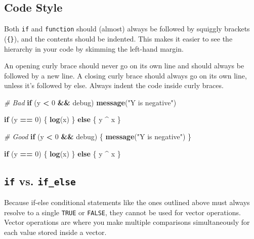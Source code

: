 \documentclass[]{book}
\newenvironment{Shaded}{\begin{snugshade}}{\end{snugshade}}
\newcommand{\CommentTok}[1]{\textcolor[rgb]{0.56,0.35,0.01}{\textit{#1}}}
\newcommand{\ControlFlowTok}[1]{\textcolor[rgb]{0.13,0.29,0.53}{\textbf{#1}}}
\newcommand{\DecValTok}[1]{\textcolor[rgb]{0.00,0.00,0.81}{#1}}
\newcommand{\KeywordTok}[1]{\textcolor[rgb]{0.13,0.29,0.53}{\textbf{#1}}}
\newcommand{\NormalTok}[1]{#1}
\newcommand{\OperatorTok}[1]{\textcolor[rgb]{0.81,0.36,0.00}{\textbf{#1}}}
\newcommand{\StringTok}[1]{\textcolor[rgb]{0.31,0.60,0.02}{#1}}
\begin{document}
\hypertarget{code-style}{%
\subsection{Code Style}\label{code-style}}

Both \texttt{if} and \texttt{function} should (almost) always be followed by squiggly brackets (\texttt{\{\}}), and the contents should be indented. This makes it easier to see the hierarchy in your code by skimming the left-hand margin.

An opening curly brace should never go on its own line and should always be followed by a new line. A closing curly brace should always go on its own line, unless it's followed by else. Always indent the code inside curly braces.

\begin{Shaded}
\begin{Highlighting}[]
\CommentTok{# Bad}
\ControlFlowTok{if}\NormalTok{ (y }\OperatorTok{<}\StringTok{ }\DecValTok{0} \OperatorTok{&&}\StringTok{ }\NormalTok{debug)}
\KeywordTok{message}\NormalTok{(}\StringTok{"Y is negative"}\NormalTok{)}

\ControlFlowTok{if}\NormalTok{ (y }\OperatorTok{==}\StringTok{ }\DecValTok{0}\NormalTok{) \{}
  \KeywordTok{log}\NormalTok{(x)}
\NormalTok{\} }
\ControlFlowTok{else}\NormalTok{ \{}
\NormalTok{  y }\OperatorTok{^}\StringTok{ }\NormalTok{x}
\NormalTok{\}}

\CommentTok{# Good}
\ControlFlowTok{if}\NormalTok{ (y }\OperatorTok{<}\StringTok{ }\DecValTok{0} \OperatorTok{&&}\StringTok{ }\NormalTok{debug) \{}
  \KeywordTok{message}\NormalTok{(}\StringTok{"Y is negative"}\NormalTok{)}
\NormalTok{\}}

\ControlFlowTok{if}\NormalTok{ (y }\OperatorTok{==}\StringTok{ }\DecValTok{0}\NormalTok{) \{}
  \KeywordTok{log}\NormalTok{(x)}
\NormalTok{\} }\ControlFlowTok{else}\NormalTok{ \{}
\NormalTok{  y }\OperatorTok{^}\StringTok{ }\NormalTok{x}
\NormalTok{\}}
\end{Highlighting}
\end{Shaded}

\hypertarget{if-vs.-if_else}{%
\subsection{\texorpdfstring{\texttt{if} vs. \texttt{if\_else}}{if vs. if\_else}}\label{if-vs.-if_else}}

Because if-else conditional statements like the ones outlined above must always resolve to a single \texttt{TRUE} or \texttt{FALSE}, they cannot be used for vector operations. Vector operations are where you make multiple comparisons simultaneously for each value stored inside a vector.
\end{document}
